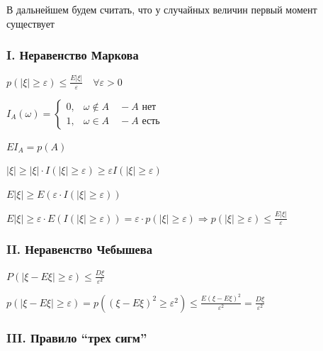 \documentclass[12pt]{article}
\begin{document}
    В дальнейшем будем считать, что у случайных величин первый момент существует

    \subsubsection{I. Неравенство Маркова}

    \hypertarget{markovsinequality}{}

    \begin{MyTheorem}
        \Ths $p(|\xi| \geq \varepsilon) \leq \frac{E|\xi|}{\varepsilon} \quad \forall \varepsilon > 0$
    \end{MyTheorem}

    \begin{MyProof}
        $I_A(\omega) = \begin{cases}0, & \omega \notin A \quad - A\text{ нет} \\ 1, & \omega \in A \quad - A\text{ есть}\end{cases}$

        $EI_A = p(A)$

        $|\xi| \geq |\xi| \cdot I(|\xi| \geq \varepsilon) \geq \varepsilon I(|\xi| \geq \varepsilon)$

        $E|\xi| \geq E(\varepsilon \cdot I(|\xi| \geq \varepsilon))$

        $E|\xi| \geq \varepsilon \cdot E(I(|\xi| \geq \varepsilon)) = \varepsilon \cdot p(|\xi| \geq \varepsilon) 
        \Longrightarrow p(|\xi| \geq \varepsilon) \leq \frac{E|\xi|}{\varepsilon}$
    \end{MyProof}

    \hypertarget{chebyshevsinequality}{}

    \subsubsection{II. Неравенство Чебышева}

    \begin{MyTheorem}
        \Ths $P(|\xi - E\xi| \geq \varepsilon) \leq \frac{D\xi}{\varepsilon^2}$
    \end{MyTheorem}

    \begin{MyProof}
        $p(|\xi - E\xi| \geq \varepsilon) = p((\xi - E\xi)^2 \geq \varepsilon^2) \leq \frac{E(\xi - E\xi)^2}{\varepsilon^2} = \frac{D\xi}{\varepsilon^2}$
    \end{MyProof}

    \subsubsection{III. Правило \enquote{трех сигм}}
    
\end{document}
